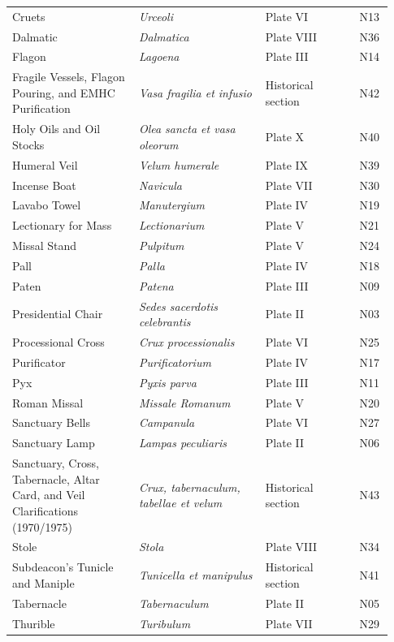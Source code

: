 {\begin{longtable}{>{\raggedright\arraybackslash}p{0.31\linewidth}>{\raggedright\arraybackslash}p{0.31\linewidth}>{\raggedright\arraybackslash}p{0.23\linewidth}>{\raggedright\arraybackslash}p{0.08\linewidth}}
Cruets & \textit{Urceoli} & Plate VI & N13 \\
Dalmatic & \textit{Dalmatica} & Plate VIII & N36 \\
Flagon & \textit{Lagoena} & Plate III & N14 \\
Fragile Vessels, Flagon Pouring, and EMHC Purification & \textit{Vasa fragilia et infusio} & Historical section & N42 \\
Holy Oils and Oil Stocks & \textit{Olea sancta et vasa oleorum} & Plate X & N40 \\
Humeral Veil & \textit{Velum humerale} & Plate IX & N39 \\
Incense Boat & \textit{Navicula} & Plate VII & N30 \\
Lavabo Towel & \textit{Manutergium} & Plate IV & N19 \\
Lectionary for Mass & \textit{Lectionarium} & Plate V & N21 \\
Missal Stand & \textit{Pulpitum} & Plate V & N24 \\
Pall & \textit{Palla} & Plate IV & N18 \\
Paten & \textit{Patena} & Plate III & N09 \\
Presidential Chair & \textit{Sedes sacerdotis celebrantis} & Plate II & N03 \\
Processional Cross & \textit{Crux processionalis} & Plate VI & N25 \\
Purificator & \textit{Purificatorium} & Plate IV & N17 \\
Pyx & \textit{Pyxis parva} & Plate III & N11 \\
Roman Missal & \textit{Missale Romanum} & Plate V & N20 \\
Sanctuary Bells & \textit{Campanula} & Plate VI & N27 \\
Sanctuary Lamp & \textit{Lampas peculiaris} & Plate II & N06 \\
Sanctuary, Cross, Tabernacle, Altar Card, and Veil Clarifications (1970/1975) & \textit{Crux, tabernaculum, tabellae et velum} & Historical section & N43 \\
Stole & \textit{Stola} & Plate VIII & N34 \\
Subdeacon's Tunicle and Maniple & \textit{Tunicella et manipulus} & Historical section & N41 \\
Tabernacle & \textit{Tabernaculum} & Plate II & N05 \\
Thurible & \textit{Turibulum} & Plate VII & N29 \\
\bottomrule
\end{longtable}}

